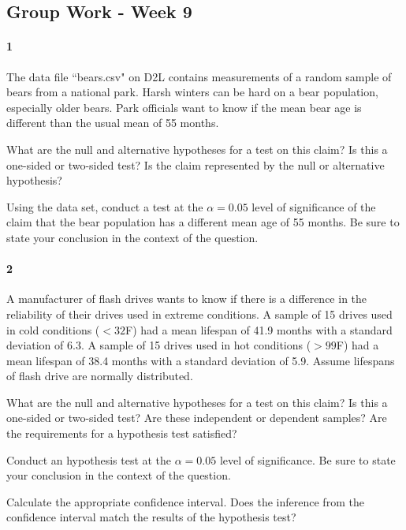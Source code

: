 \documentclass{article}
\begin{document}
\begin{flushleft}
\section*{Group Work - Week 9}

\paragraph{1} The data file ``bears.csv" on D2L contains measurements of a random sample of bears from a national park. Harsh winters can be hard on a bear population, especially older bears. Park officials want to know if the mean bear age is different than the usual mean of 55 months.

\begin{enumalpha}
\item What are the null and alternative hypotheses for a test on this claim? Is this a one-sided or two-sided test? Is the claim represented by the null or alternative hypothesis?
\vspace{2.5in}
\item Using the data set, conduct a test at the $\alpha = 0.05$ level of significance of the claim that the bear population has a different mean age of 55 months. Be sure to state your conclusion in the context of the question. 

\end{enumalpha}

\newpage
\paragraph{2} A manufacturer of flash drives wants to know if there is a difference in the reliability of their drives used in extreme conditions. A sample of 15 drives used in cold conditions ($< 32 $\textdegree F) had a mean lifespan of 41.9 months with a standard deviation of 6.3. A sample of 15 drives used in hot conditions ($> 99 $\textdegree F) had a mean lifespan of 38.4 months with a standard deviation of 5.9. Assume lifespans of flash drive are normally distributed.
\begin{enumalpha}
\item What are the null and alternative hypotheses for a test on this claim? Is this a one-sided or two-sided test? Are these independent or dependent samples? Are the requirements for a hypothesis test satisfied?
\vspace{2in}
\item Conduct an hypothesis test at the $\alpha = 0.05$ level of significance. Be sure to state your conclusion in the context of the question.
\vspace{2in}
\item Calculate the appropriate confidence interval. Does the inference from the confidence interval match the results of the hypothesis test?


\end{enumalpha}
\end{flushleft}
\end{document}
